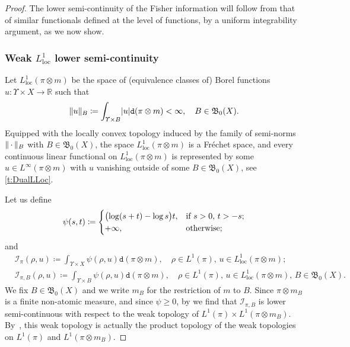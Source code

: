 \documentclass[JEP,XML,SOM,Unicode,published]{cedram}
\theoremstyle{definition}
\theoremstyle{remark}
\DeclarePairedDelimiter{\paren}{\lparen}{\rparen}
\DeclarePairedDelimiter{\abs}{\lvert}{\rvert}
\DeclarePairedDelimiter{\norm}{\lVert}{\rVert}
\newcommand{\emparg}{\,\cdot\,}
\begin{document}
\begin{proof}
The lower semi-continuity of the Fisher information will follow from that of similar functionals defined at the level of functions, by a uniform integrability argument, as we now show.

\subsubsection*{Weak $L^1_{\mathrm{loc}}$ lower semi-continuity}

Let $L^{1}_{\mathrm{loc}}(\pi \otimes m)$ be the space of (equivalence classes of) Borel functions $u \colon \varUpsilon \times X \to \mathbb{R}$ such that
\begin{equation*}
\norm{u}_{B} \coloneq \int_{\varUpsilon \times B} \abs{u} \mathtt{d}(\pi \otimes m) < \infty, \quad B \in \mathfrak{B}_{0}(X).
\end{equation*}
Equipped with the locally convex topology induced by the family of semi-norms $\norm{\emparg}_{B}$ with $B \in \mathfrak{B}_{0}(X)$, the space $L^{1}_{\mathrm{loc}}(\pi \otimes m)$ is a Fréchet space, and every continuous linear functional on $L^{1}_{\mathrm{loc}}(\pi \otimes m)$ is represented by some $u \in L^{\infty}(\pi \otimes m)$ with $u$ vanishing outside of some $B \in \mathfrak{B}_{0}(X)$, see \cref{t:DualLLoc}.

Let us define
\begin{equation*}
\psi(s,t) \coloneq
\begin{cases}
\paren[\big]{\log(s+t) - \log s} t, & \text{if } s > 0,\, t > - s;
\\ +\infty, & \text{otherwise;}
\end{cases}
\end{equation*}
and
\begin{align*}
& \mathcal{I}_{\pi}(\rho, u) \coloneq \int_{\varUpsilon \times X} \psi(\rho,u) \mathtt{d} (\pi \otimes m), \quad \rho \in L^{1}(\pi),\, u \in L^{1}_{\mathrm{loc}}(\pi \otimes m); \\
& \mathcal{I}_{\pi,B}(\rho, u) \coloneq \int_{\varUpsilon \times B} \psi(\rho, u) \mathtt{d} (\pi \otimes m), \quad \rho \in L^{1}(\pi),\, u \in L_{\mathrm{loc}}^{1}(\pi \otimes m),\, B\in\mathfrak{B}_0(X).
\end{align*}
We fix $B \in \mathfrak{B}_{0}(X)$ and we write $m_{B}$ for the restriction of $m$ to $B$.
Since $\pi \otimes m_{B}$ is a finite non-atomic measure, and since $\psi \geq 0$, by \cite[Th.\,1]{Ioffe} we find that $\mathcal{I}_{\pi,B}$ is lower semi-continuous with respect to the weak topology of $L^{1}(\pi) \times L^{1}(\pi \otimes m_{B})$.
By~\cite[II, p.\,53, Prop.\,8]{BourbakiEVT}, this weak topology is actually the product topology of the weak topologies on $L^1(\pi)$ and $L^1(\pi\otimes m_{B})$.


\end{proof}
\end{document}
